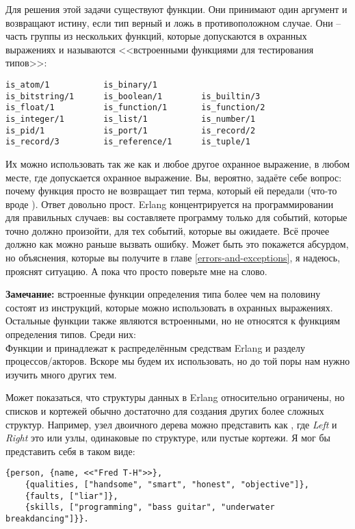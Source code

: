 Для решения этой задачи существуют функции. Они принимают один аргумент и возвращают истину, если тип верный и ложь в противоположном случае. Они \--- часть группы из нескольких функций, которые допускаются в охранных выражениях и называются <<встроенными функциями для тестирования типов>>:
\begin{lstlisting}[style=erlang]
is_atom/1           is_binary/1        
is_bitstring/1      is_boolean/1        is_builtin/3       
is_float/1          is_function/1       is_function/2      
is_integer/1        is_list/1           is_number/1        
is_pid/1            is_port/1           is_record/2        
is_record/3         is_reference/1      is_tuple/1        
\end{lstlisting}

Их можно использовать так же как и любое другое охранное выражение, в любом месте, где допускается охранное выражение. Вы, вероятно, задаёте себе вопрос: почему функция просто не возвращает тип терма, который ей передали (что\--то вроде ). Ответ довольно прост. Erlang концентрируется на программировании для правильных случаев: вы составляете программу только для событий, которые точно должно произойти, для тех событий, которые вы ожидаете. Всё прочее должно как можно раньше вызвать ошибку. Может быть это покажется абсурдом, но объяснения, которые вы получите в главе \ref{errors-and-exceptions}, я надеюсь, прояснят ситуацию. А пока что просто поверьте мне на слово.\\
\colorbox{lgray}
{
    \begin{minipage}{\linewidth}
\textbf{Замечание:} встроенные функции определения типа более чем на половину состоят из инструкций, которые можно использовать в охранных выражениях. Остальные функции также являются встроенными, но не относятся к функциям определения типов. Среди них: 
\\
Функции  и  принадлежат к распределённым средствам Erlang и разделу процессов/акторов. Вскоре мы будем их использовать, но до той поры нам нужно изучить много других тем.
    \end{minipage}
}

Может показаться, что структуры данных в Erlang относительно ограничены, но списков и кортежей обычно достаточно для создания других более сложных структур. Например, узел двоичного дерева можно представить как , где \emph{Left} и \emph{Right} это или узлы, одинаковые по структуре, или пустые кортежи. Я мог бы представить себя в таком виде:
\begin{lstlisting}[style=erlang]
{person, {name, <<"Fred T-H">>},
    {qualities, ["handsome", "smart", "honest", "objective"]},
    {faults, ["liar"]},
    {skills, ["programming", "bass guitar", "underwater breakdancing"]}}.
\end{lstlisting}

